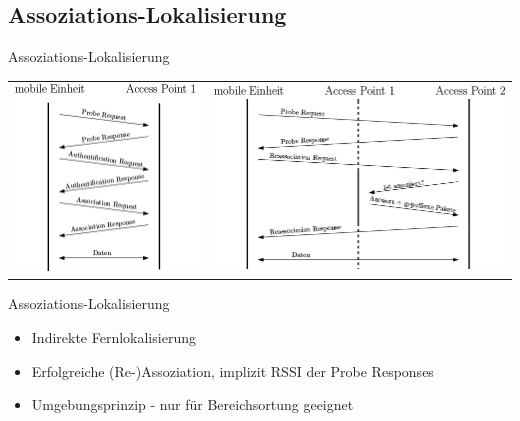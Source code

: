 \documentclass[18pt]{beamer}
\begin{document}
\subsection{Assoziations-Lokalisierung}
\begin{frame}{Assoziations-Lokalisierung}
	\begin{tabular}{cc}
		\includegraphics[height=0.5\textheight]{images/reupper.png} & \includegraphics[height=0.5\textheight]{images/relower.png}\\
	\end{tabular}
	\begin{block}{Assoziations-Lokalisierung}
		\begin{itemize}
			\item Indirekte Fernlokalisierung
			\item Erfolgreiche (Re-)Assoziation, implizit RSSI der Probe Responses
			\item Umgebungsprinzip - nur für Bereichsortung geeignet
		\end{itemize}
	\end{block}
\end{frame}
\end{document}
